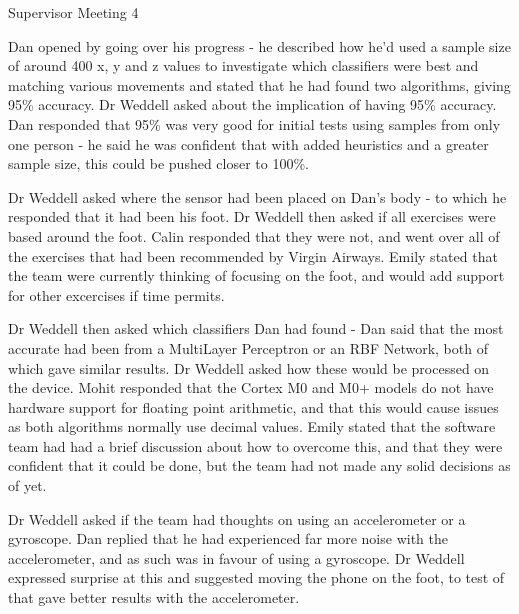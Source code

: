 \documentclass{article}
\begin{document}

\begin{Minutes}{Supervisor Meeting 4}
\starttime{15:00}
\endtime{15:30}
\location{59/4231}
\maketitle

\topic{Machine Learning}
Dan opened by going over his progress - he described how he'd used a sample size of around 400 x, y and z values to investigate which classifiers were best and matching various movements and stated that he had found two algorithms, giving 95\% accuracy.
Dr Weddell asked about the implication of having 95\% accuracy. Dan responded that 95\% was very good for initial tests using samples from only one person - he said he was confident that with added heuristics and a greater sample size, this could be pushed closer to 100\%.

Dr Weddell asked where the sensor had been placed on Dan's body - to which he responded that it had been his foot. Dr Weddell then asked if all exercises were based around the foot. Calin responded that they were not, and went over all of the exercises that had been recommended by Virgin Airways.
Emily stated that the team were currently thinking of focusing on the foot, and would add support for other excercises if time permits.

Dr Weddell then asked which classifiers Dan had found - Dan said that the most accurate had been from a MultiLayer Perceptron or an RBF Network, both of which gave similar results.
Dr Weddell asked how these would be processed on the device. Mohit responded that the Cortex M0 and M0+ models do not have hardware support for floating point arithmetic, and that this would cause issues as both algorithms normally use decimal values.
Emily stated that the software team had had a brief discussion about how to overcome this, and that they were confident that it could be done, but the team had not made any solid decisions as of yet.

\topic{Sensor}

Dr Weddell asked if the team had thoughts on using an accelerometer or a gyroscope. Dan replied that he had experienced far more noise with the accelerometer, and as such was in favour of using a gyroscope.
Dr Weddell expressed surprise at this and suggested moving the phone on the foot, to test of that gave better results with the accelerometer.


\end{Minutes}
\end{document}
